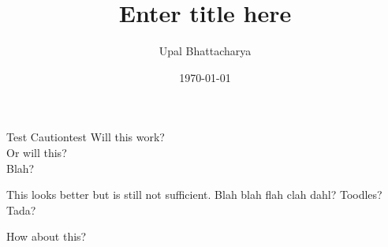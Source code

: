 \documentclass[a4paper]{article}
\author{Upal Bhattacharya}
\date{\today}
\title{Enter title here}
\begin{document}
\maketitle

\linenumbers

\begin{caution}{Test Caution}{test}
  Will this work? \\
  Or will this? \\
  Blah?
\end{caution}

This looks better but is still not sufficient. Blah blah flah clah dahl? Toodles?
Tada?

How about this?
\end{document}
